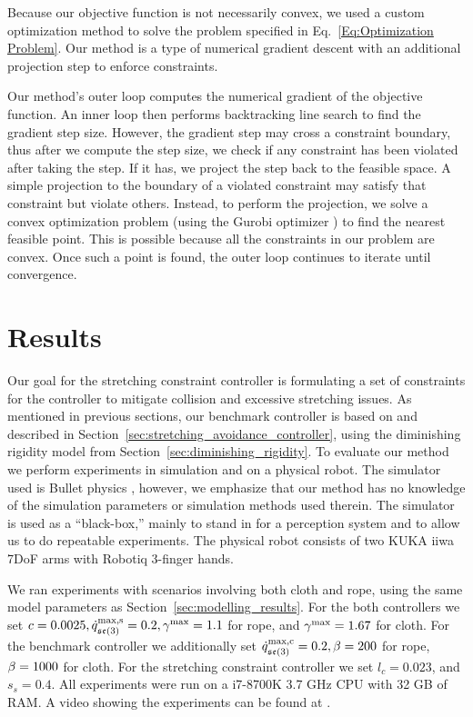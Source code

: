 Because our objective function is not necessarily convex, we used a custom optimization method to solve the problem specified in Eq.~\ref{Eq:Optimization Problem}. Our method is a type of numerical gradient descent with an additional projection step to enforce constraints.

Our method's outer loop computes the numerical gradient of the objective function. An inner loop then performs backtracking line search to find the gradient step size. However, the gradient step may cross a constraint boundary, thus after we compute the step size, we check if any constraint has been violated after taking the step. If it has, we project the step back to the feasible space. A simple projection to the boundary of a violated constraint may satisfy that constraint but violate others. Instead, to perform the projection, we solve a convex optimization problem (using the Gurobi optimizer \cite{Gurobi2016}) to find the nearest feasible point. This is possible because all the constraints in our problem are convex. Once such a point is found, the outer loop continues to iterate until convergence.


\section{Results}
\label{sec:stretching_constraint_controller_results}

Our goal for the stretching constraint controller is formulating a set of constraints for the controller to mitigate collision and excessive stretching issues. As mentioned in previous sections, our benchmark controller is based on \cite{Berenson2013} and described in Section~\ref{sec:stretching_avoidance_controller}, using the diminishing rigidity model from Section~\ref{sec:diminishing_rigidity}. To evaluate our method we perform experiments in simulation and on a physical robot. The simulator used is Bullet physics \cite{Coumans2010}, however, we emphasize that our method has no knowledge of the simulation parameters or simulation methods used therein. The simulator is used as a ``black-box,'' mainly to stand in for a perception system and to allow us to do repeatable experiments. The physical robot consists of two KUKA iiwa 7DoF arms with Robotiq 3-finger hands.

We ran experiments with scenarios involving both cloth and rope, using the same model parameters as Section~\ref{sec:modelling_results}. For the both controllers we set $c = 0.0025, \dot{q}^\textrm{max,s}_{\mathfrak{se}(3)} = 0.2, \gamma^{\textrm{max}} = 1.1$ for rope, and $\gamma^{\textrm{max}} = 1.67$ for cloth. For the benchmark controller we additionally set $\dot{q}^\textrm{max,c}_{\mathfrak{se}(3)} = 0.2, \beta = 200$ for rope, $\beta = 1000$ for cloth. For the stretching constraint controller we set $l_c = 0.023$, and $s_s = 0.4$. All experiments were run on a i7-8700K 3.7 GHz CPU with 32 GB of RAM. A video showing the experiments can be found at \irosurl.


